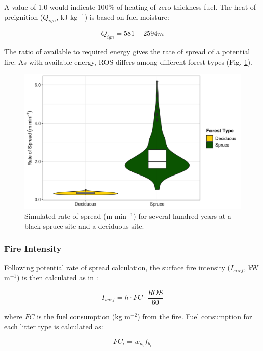 \documentclass[a4paper, 12pt] {report}
\begin{document}
A value of 1.0 would indicate 100\% of heating of zero-thickness fuel. The heat of preignition ($Q_{ign}$, kJ kg$^{-1}$) is based on fuel moisture:

\begin{equation}
	Q_{ign} = 581 + 2594m
\end{equation}

The ratio of available to required energy gives the rate of spread of a potential fire. As with available energy, ROS differs among different forest types (Fig. \ref{fig:rosf}).

\begin{figure}
	\includegraphics[width=\linewidth]{figures/rosf.png}
	\caption{Simulated rate of spread (m min$^{-1}$) for several hundred years at a black spruce site and a deciduous site.}
	\label{fig:rosf}
\end{figure}

\subsubsection{Fire Intensity} \label{fireintense}

Following potential rate of spread calculation, the surface fire intensity ($I_{surf}$, kW m$^{-1}$) is then calculated as in :

\begin{equation}
	I_{surf} = h \cdot FC \cdot \frac{ROS}{60}
\end{equation}

where $FC$ is the fuel consumption (kg m$^{-2}$) from the fire. Fuel consumption for each litter type is calculated as:

\begin{equation}
	FC_i = w_{n_i}f_{b_i}
\end{equation}
\end{document}
